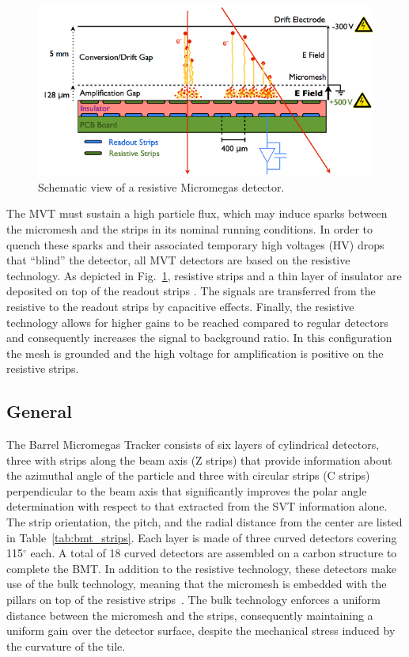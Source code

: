 \begin{figure}[thb]
\begin{center}
\includegraphics[width=1.8\columnwidth,keepaspectratio]{images/mm_principle}
\end{center}

\caption{Schematic view of a resistive Micromegas detector.}
\label{fig:mm-principle}
\end{figure}

The MVT must sustain a high particle flux, which may induce sparks between the micromesh and the strips in its nominal
running conditions. In order to quench these sparks and their associated temporary high voltages (HV) drops that ``blind''
the detector, all MVT detectors are based on the resistive technology. As depicted in Fig.~\ref{fig:mm-principle}, resistive
strips and a thin layer of insulator are deposited on top of the readout strips \cite{ALEXOPOULOS2011110}. The signals are
transferred from the resistive to the readout strips by capacitive effects. Finally, the resistive technology allows for higher
gains to be reached compared to regular detectors and consequently increases the signal to background ratio. In this
configuration the mesh is grounded and the high voltage for amplification is positive on the resistive strips. 

\subsection{General}

The Barrel Micromegas Tracker consists of six layers of cylindrical detectors, three with strips along the beam axis (Z strips)
that provide information about the azimuthal angle of the particle and three with circular strips (C strips) perpendicular to the
beam axis that significantly improves the polar angle determination with respect to that extracted from the SVT information
alone. The strip orientation, the pitch, and the radial distance from the center are listed in 
Table~\ref{tab:bmt_strips}. Each layer is made of three curved detectors covering 115$^\circ$ each. A total of 18 
curved detectors are assembled on a carbon structure to complete the BMT. In addition to the resistive technology, 
these detectors make use of the bulk technology, meaning that the micromesh is embedded with the pillars on top of the 
resistive strips~\cite{GIOMATARIS2006405}. The bulk technology enforces a uniform distance between the micromesh and the 
strips, consequently maintaining a uniform gain over the detector surface, despite the mechanical stress induced by the 
curvature of the tile.

